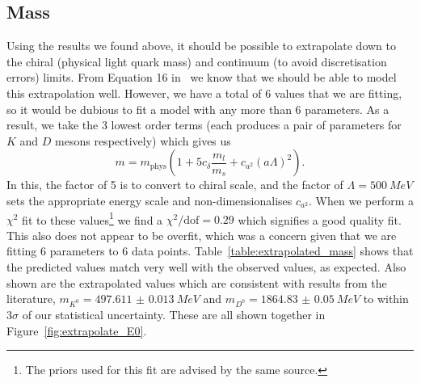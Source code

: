 \documentclass[a4paper,12pt]{article}
\begin{document}
\subsection{Mass}
Using the results we found above, it should be possible to extrapolate down to the chiral (physical light quark mass) and continuum (to avoid discretisation errors) limits. From Equation 16 in~\cite{chakraborty2017nonperturbative} we know that we should be able to model this extrapolation well. However, we have a total of 6 values that we are fitting, so it would be dubious to fit a model with any more than 6 parameters. As a result, we take the 3 lowest order terms (each produces a pair of parameters for $K$ and $D$ mesons respectively) which gives us
\begin{equation}
    \label{eq:extrapolate}
m = m_\mathrm{phys} \left(1 + 5c_\delta \frac{m_l}{m_s} + c_{a^2} {(a\Lambda)}^2\right).
\end{equation}
In this, the factor of 5 is to convert to chiral scale, and the factor of $\Lambda=\SI{500}{MeV}$ sets the appropriate energy scale and non-dimensionalises $c_{a^2}$. When we perform a $\chi^2$ fit to these values\footnote{The priors used for this fit are advised by the same source.} we find a $\chi^2 / \mathrm{dof} = 0.29$ which signifies a good quality fit. This also does not appear to be overfit, which was a concern given that we are fitting 6 parameters to 6 data points. Table~\ref{table:extrapolated_mass} shows that the predicted values match very well with the observed values, as expected. Also shown are the extrapolated values which are consistent with results from the literature\cite{zyla2020review}, $m_{K^0} = \SI{497.611(13)}{MeV}$ and $m_{D^0} = \SI{1864.83(5)}{MeV}$ to within $3\sigma$ of our statistical uncertainty. These are all shown together in Figure~\ref{fig:extrapolate_E0}.
\end{document}
